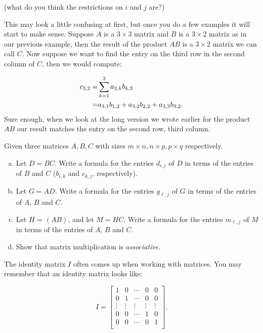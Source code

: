 (what do you think the restrictions on $i$ and $j$ are?)

This may look a little confusing at first, but once you do a few examples it will start to make sense.  Suppose ${A}$ is a $3 \times 3$ matrix and ${B}$ is a $3 \times 2$ matrix as in our previous example, then the result of the product ${A} {B}$ is a $3 \times 2 $ matrix we can call ${C}$.  Now suppose we want to find the entry on the third row in the second column of ${C}$, then we would compute:

\begin{align}
{c}_{3,2} =& \sum_{k=1}^3 a_{3,k} b_{k,2} \notag\\
=& a_{3,1} b_{1,2} + a_{3,2} b_{2,2} + a_{3,3} b_{3,2}.  \notag
\end{align}
Sure enough, when we look at the long version we wrote earlier for the product ${AB}$ our result matches the entry on the second row, third column.

\begin{exercise}{}
Given three matrices $A, B, C$ with sizes $m \times n, n \times p, p \times q$ respectively.
\begin{enumerate}[(a)]
\item
Let $D = BC$.  Write a formula for the entries $d_{i,j}$ of $D$ in terms of the entries of $B$ and $C$ ($b_{i,k}$ and $c_{k,j}$, respectively). 
\item
Let $G = AD$.  Write a formula for the entries $g_{\ell,j}$ of $G$ in terms of the entries of $A$, $B$ and $C$.
\item
Let $H$ =  $(AB)$, and let $M = HC$. Write a formula for the entries $m_{\ell,j}$ of $M$ in terms of the entries of $A$, $B$ and $C$.
\item
Show that matrix multiplication is \emph{associative}.
\end{enumerate}
\end{exercise}

The {\bfi identity matrix} $I$ often comes up when working with matrices. You may remember that an identity matrix looks like:

\[I = \left[ \begin{array}{ccccc}
1 & 0  & \cdots & 0 & 0 \\
0 & 1  & \cdots & 0 & 0  \\
\vdots & \vdots & \vdots & \vdots & \vdots\\
0 & 0  & \cdots & 1 & 0  \\
0 & 0  & \cdots & 0 & 1  \\
 \end{array} \right]. \]

